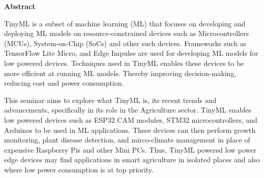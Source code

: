 \vspace{.25in}
\begin{center}
\large{\textbf{Abstract}}\\
\vspace{0.3in}
\end{center}
\indent


TinyML is a subset of machine learning (ML) that focuses on developing and deploying
ML models on resource-constrained devices such as Microcontrollers (MCUs), System-on-Chip
(SoCs) and other such devices. Frameworks such as TensorFlow Lite Micro, and Edge Impulse
are used for developing ML models for low powered devices. Techniques used in TinyML
enables these devices to be more efficient at running ML models. Thereby improving
decision-making, reducing cost and power consumption.


This seminar aims to explore what TinyML is, its recent trends and advancements, specifically in its role in the
Agriculture sector. TinyML enables low powered devices such as ESP32 CAM modules, STM32
microcontrollers, and Arduinos to be used in ML applications. These devices can then
perform growth monitoring, plant disease detection, and mirco-climate management in
place of expensive Raspberry Pis and other Mini PCs. Thus, TinyML powered low power
edge devices may find applications in smart agriculture in isolated places and also where
low power consumption is at top priority.
